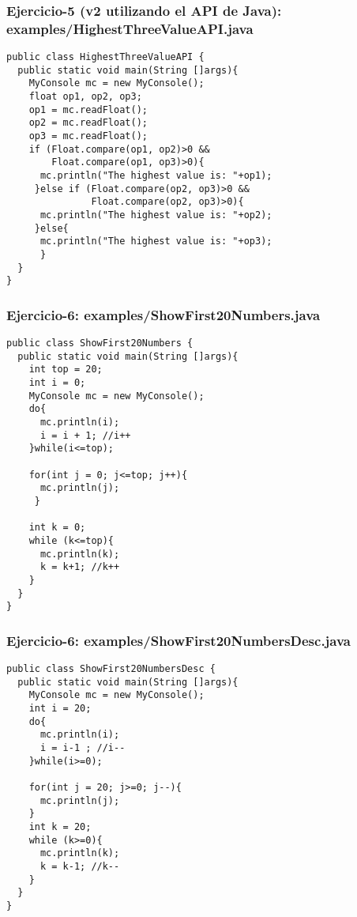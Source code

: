 \documentclass[xcolor=dvipsnames,dvip,notes=show,handout,table]{beamer}
\begin{document}
\begin{frame}[fragile]
\frametitle{Ejercicio-5 (v2 utilizando el API de Java): examples/HighestThreeValueAPI.java}
\scriptsize
\begin{lstlisting}
public class HighestThreeValueAPI {
  public static void main(String []args){
    MyConsole mc = new MyConsole();
    float op1, op2, op3;
    op1 = mc.readFloat();
    op2 = mc.readFloat();
    op3 = mc.readFloat();
    if (Float.compare(op1, op2)>0 && 
        Float.compare(op1, op3)>0){
      mc.println("The highest value is: "+op1);
     }else if (Float.compare(op2, op3)>0 && 
               Float.compare(op2, op3)>0){
      mc.println("The highest value is: "+op2);
     }else{
      mc.println("The highest value is: "+op3);
      }
  }
}
\end{lstlisting}
\end{frame}




\begin{frame}[fragile]
\frametitle{Ejercicio-6: examples/ShowFirst20Numbers.java}
\scriptsize
\begin{lstlisting}
public class ShowFirst20Numbers {
  public static void main(String []args){
    int top = 20;
    int i = 0;
    MyConsole mc = new MyConsole();
    do{
      mc.println(i);
      i = i + 1; //i++
    }while(i<=top);

    for(int j = 0; j<=top; j++){
      mc.println(j);
     }
    
    int k = 0;
    while (k<=top){
      mc.println(k);
      k = k+1; //k++
    }
  }
}
\end{lstlisting}
\end{frame}




\begin{frame}[fragile]
\frametitle{Ejercicio-6: examples/ShowFirst20NumbersDesc.java}
\scriptsize
\begin{lstlisting}
public class ShowFirst20NumbersDesc {
  public static void main(String []args){		
    MyConsole mc = new MyConsole();
    int i = 20;
    do{
      mc.println(i);
      i = i-1 ; //i--
    }while(i>=0);

    for(int j = 20; j>=0; j--){
      mc.println(j);
    }
    int k = 20;
    while (k>=0){
      mc.println(k);
      k = k-1; //k--
    }
  }
}
\end{lstlisting}
\end{frame}
\end{document}
